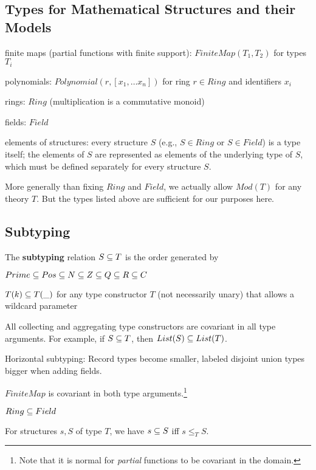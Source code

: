 \subsection{Types for Mathematical Structures and their Models}

\begin{compactitem}
 \item finite maps (partial functions with finite support): $FiniteMap(T_1,T_2)$ for types $T_i$
 \item polynomials: $Polynomial(r,[x_1,\ldots x_n])$ for ring $r\in Ring$ and identifiers $x_i$
 \item rings: $Ring$ (multiplication is a commutative monoid)
 \item fields: $Field$
 \item elements of structures: every structure $S$ (e.g., $S\in Ring$ or $S\in Field$) is a type itself; the elements of $S$ are represented as elements of the underlying type of $S$, which must be defined separately for every structure $S$.
\end{compactitem}
More generally than fixing $Ring$ and $Field$, we actually allow $Mod(T)$ for any theory $T$.
But the types listed above are sufficient for our purposes here.

\subsection{Subtyping}

The \textbf{subtyping} relation $S\sq T$ is the order generated by
\begin{compactitem}
 \item $Prime\sq Pos\sq N\sq Z\sq Q\sq R\sq C$
 \item $T(k)\sq T(\_)$ for any type constructor $T$ (not necessarily unary) that allows a wildcard parameter
 \item All collecting and aggregating type constructors are covariant in all type arguments. For example, if $S\sq T$, then $List(S)\sq List(T)$.
 \item Horizontal subtyping: Record types become smaller, labeled disjoint union types bigger when adding fields.
 \item $FiniteMap$ is covariant in both type arguments.\footnote{Note that it is normal for \emph{partial} functions to be covariant in the domain.}
 \item $Ring\sq Field$
 \item For structures $s,S$ of type $T$, we have $s\sq S$ iff $s\leq_T S$. 
\end{compactitem}

